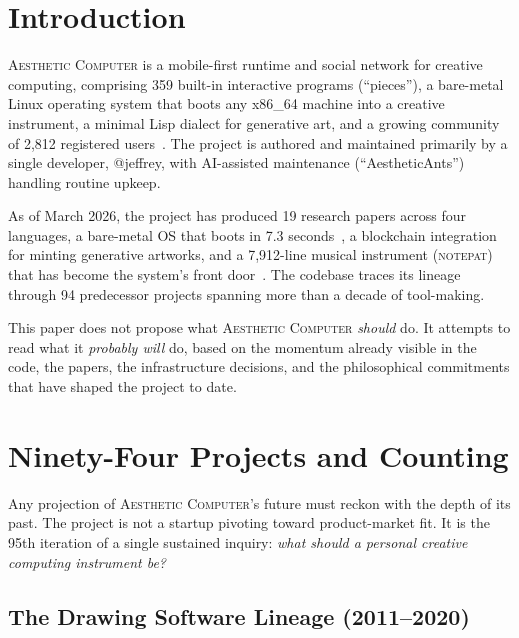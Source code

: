 \documentclass[10pt,letterpaper,twocolumn]{article}
\newcommand{\ac}{\textsc{Aesthetic Computer}}
\newcommand{\np}{\textsc{notepat}}
\begin{document}

\section{Introduction}

\ac{} is a mobile-first runtime and social network for creative computing, comprising 359 built-in interactive programs (``pieces''), a bare-metal Linux operating system that boots any x86\_64 machine into a creative instrument, a minimal Lisp dialect for generative art, and a growing community of 2,812 registered users~\citep{scudder2026ac}. The project is authored and maintained primarily by a single developer, @jeffrey, with AI-assisted maintenance (``AestheticAnts'') handling routine upkeep.

As of March 2026, the project has produced 19 research papers across four languages, a bare-metal OS that boots in 7.3 seconds~\citep{scudder2026os}, a blockchain integration for minting generative artworks, and a 7,912-line musical instrument (\np{}) that has become the system's front door~\citep{scudder2026notepat}. The codebase traces its lineage through 94 predecessor projects spanning more than a decade of tool-making.

This paper does not propose what \ac{} \emph{should} do. It attempts to read what it \emph{probably will} do, based on the momentum already visible in the code, the papers, the infrastructure decisions, and the philosophical commitments that have shaped the project to date.


\section{Ninety-Four Projects and Counting}
\label{sec:history}

Any projection of \ac{}'s future must reckon with the depth of its past. The project is not a startup pivoting toward product-market fit. It is the 95th iteration of a single sustained inquiry: \emph{what should a personal creative computing instrument be?}

\subsection{The Drawing Software Lineage (2011--2020)}
\end{document}
